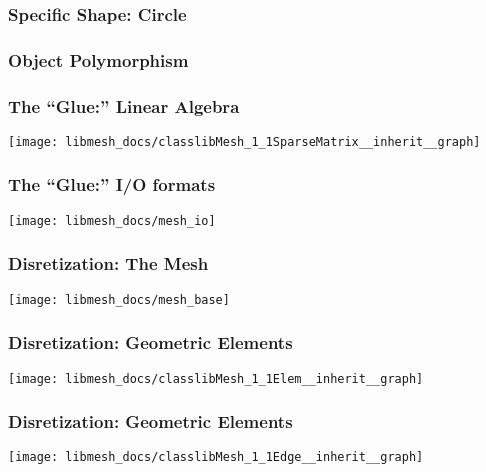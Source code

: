 \frame
{
  \frametitle{Specific Shape: Circle}
  
}



\frame
{
  \frametitle{Object Polymorphism}
  
}



\frame
{
  \Large
  \begin{block}{}
    \center{\bf \libmesh{}}
  \end{block}
}



\frame
{
  \frametitle{The ``Glue:'' Linear Algebra}
  \begin{center}
    \texttt{[image: libmesh\_docs/classlibMesh\_1\_1SparseMatrix\_\_inherit\_\_graph]}
  \end{center}
}



\frame
{
  \frametitle{The ``Glue:'' I/O formats}
  \begin{center}
    \texttt{[image: libmesh\_docs/mesh\_io]}
  \end{center}
}



\frame
{
  \frametitle{Disretization: The Mesh}
  \begin{center}
    \texttt{[image: libmesh\_docs/mesh\_base]}
  \end{center}
}      



\frame
{
  \frametitle{Disretization: Geometric Elements}
  \begin{center}
    \texttt{[image: libmesh\_docs/classlibMesh\_1\_1Elem\_\_inherit\_\_graph]}
  \end{center}
}      



\frame
{
  \frametitle{Disretization: Geometric Elements}
  \begin{center}
    \texttt{[image: libmesh\_docs/classlibMesh\_1\_1Edge\_\_inherit\_\_graph]}
  \end{center}
}      




